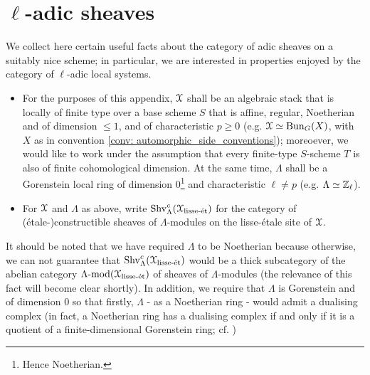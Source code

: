 \section{\texorpdfstring{$\ell$}{}-adic sheaves}
    We collect here certain useful facts about the category of adic sheaves on a suitably nice scheme; in particular, we are interested in properties enjoyed by the category of $\ell$-adic local systems.
    
    \begin{convention}
        \noindent
        \begin{itemize}
            \item For the purposes of this appendix, $\mathcal{X}$ shall be an algebraic stack that is locally of finite type over a base scheme $S$ that is affine, regular, Noetherian and of dimension $\leq 1$, and of characteristic $p \geq 0$ (e.g. $\mathcal{X} \simeq \mathrm{Bun}_G(X)$, with $X$ as in convention \ref{conv: automorphic_side_conventions}); moreoever, we would like to work under the assumption that every finite-type $S$-scheme $T$ is also of finite cohomological dimension. At the same time, $\Lambda$ shall be a Gorenstein local ring of dimension $0$\footnote{Hence Noetherian.} and characteristic $\ell \not = p$ (e.g. $\Lambda \simeq \mathbb{Z}_{\ell}$).
            \item For $\mathcal{X}$ and $\Lambda$ as above, write $\mathrm{Shv}_{\Lambda}^c(\mathcal{X}_{\mathrm{lisse}\text{-}\mathrm{\acute{e}t}})$ for the category of (\'etale-)constructible sheaves of $\Lambda$-modules on the lisse-\'etale site of $\mathcal{X}$. 
        \end{itemize}
    \end{convention}
    \begin{remark}
        It should be noted that we have required $\Lambda$ to be Noetherian because otherwise, we can not guarantee that $\mathrm{Shv}_{\Lambda}^c(\mathcal{X}_{\mathrm{lisse}\text{-}\mathrm{\acute{e}t}})$ would be a thick subcategory of the abelian category $\Lambda\text{-}\mathrm{mod}(\mathcal{X}_{\mathrm{lisse}\text{-}\mathrm{\acute{e}t}})$ of sheaves of $\Lambda$-modules (the relevance of this fact will become clear shortly). In addition, we require that $\Lambda$ is Gorenstein and of dimension $0$ so that firstly, $\Lambda$ - as a Noetherian ring - would admit a dualising complex (in fact, a Noetherian ring has a dualising complex if and only if it is a quotient of a finite-dimensional Gorenstein ring; cf. \cite[Corollary 1.4]{kawasaki_macaulayfication_of_noetherian_rings})
    \end{remark}